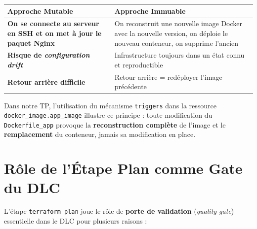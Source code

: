 \documentclass[12pt,a4paper]{report}
\begin{document}
\begin{center}
\begin{tabular}{>{\bfseries}p{5cm} p{8cm}}
  \toprule
  Approche Mutable & Approche Immuable \\
  \midrule
  On se connecte au serveur en SSH et on met à jour le paquet Nginx &
  On reconstruit une nouvelle image Docker avec la nouvelle version, on déploie
  le nouveau conteneur, on supprime l'ancien \\
  \midrule
  Risque de \textit{configuration drift} &
  Infrastructure toujours dans un état connu et reproductible \\
  \midrule
  Retour arrière difficile &
  Retour arrière = redéployer l'image précédente \\
  \bottomrule
\end{tabular}
\end{center}

\vspace{0.5em}
\noindent Dans notre TP, l'utilisation du mécanisme \texttt{triggers} dans la ressource
\texttt{docker\_image.app\_image} illustre ce principe : toute modification du
\texttt{Dockerfile\_app} provoque la \textbf{reconstruction complète} de l'image
et le \textbf{remplacement} du conteneur, jamais sa modification en place.

\section{Rôle de l'Étape Plan comme Gate du DLC}

L'étape \texttt{terraform plan} joue le rôle de \textbf{porte de validation}
(\textit{quality gate}) essentielle dans le DLC pour plusieurs raisons :
\end{document}
